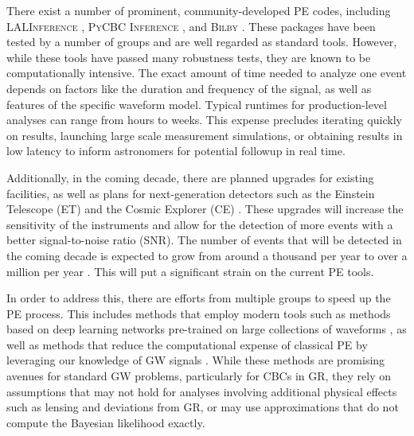 \documentclass[twocolumn]{aastex631}
\newcommand{\mi}[1]{\textsf{\color{teal}[\textbf{MI:} #1]}}
\begin{document}
There exist a number of prominent, community-developed PE codes, including
\textsc{LALInference} \cite{Veitch:2014wba}, \textsc{PyCBC Inference}
\cite{Biwer:2018osg}, and \textsc{Bilby} \cite{Ashton:2018jfp}.  These packages
have been tested by a number of groups and are well regarded as standard tools.
However, while these tools have passed many robustness tests, they are known to
be computationally intensive. The exact amount of time needed to analyze one
event depends on factors like the duration and frequency of the signal, as well
as features of the specific waveform model. Typical runtimes for
production-level analyses can range from hours to weeks. This expense precludes
iterating quickly on results, launching large scale measurement simulations, or
obtaining results in low latency to inform astronomers for potential followup
in real time.

Additionally, in the coming decade, there are planned upgrades for existing
facilities, as well as plans for next-generation detectors such as the Einstein
Telescope (ET) \cite{Punturo:2010zz} and the Cosmic Explorer (CE)
\cite{LIGOScientific:2016wof}. These upgrades will increase the sensitivity of
the instruments and allow for the detection of more events with a better
signal-to-noise ratio (SNR). The number of events that will be detected in the
coming decade is expected to grow from around a thousand per year to over a
million per year \cite{Baibhav:2019gxm}. This will put a significant strain on
the current PE tools.

In order to address this, there are efforts from multiple groups to speed up
the PE process. This includes methods that employ modern tools such as methods
based on deep learning networks pre-trained on large collections of waveforms
\cite{Dax:2021tsq,Dax:2022pxd}, as well as methods that reduce the
computational expense of classical PE by leveraging our knowledge of GW signals
\cite{Islam:2022afg,Roulet:2022kot}. While these methods are promising avenues
for standard GW problems, particularly for CBCs in GR, they rely on assumptions
that may not hold for analyses involving additional physical effects such as
lensing and deviations from GR, or may use approximations that do not compute
the Bayesian likelihood exactly.
\end{document}
